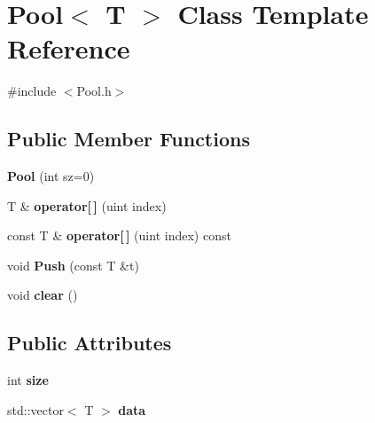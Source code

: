 \hypertarget{classPool}{}\section{Pool$<$ T $>$ Class Template Reference}
\label{classPool}


{\ttfamily \#include $<$Pool.\+h$>$}

\subsection*{Public Member Functions}
\begin{DoxyCompactItemize}
\item 
\hypertarget{classPool_a88910c57fb7099ac3219d5d232cb6d3d}{}{\bfseries Pool} (int sz=0)\label{classPool_a88910c57fb7099ac3219d5d232cb6d3d}

\item 
\hypertarget{classPool_ac4076ad218acab283dacc29e8e2cf855}{}T \& {\bfseries operator\mbox{[}$\,$\mbox{]}} (uint index)\label{classPool_ac4076ad218acab283dacc29e8e2cf855}

\item 
\hypertarget{classPool_a2835287a3cea43e35387d797544d27da}{}const T \& {\bfseries operator\mbox{[}$\,$\mbox{]}} (uint index) const \label{classPool_a2835287a3cea43e35387d797544d27da}

\item 
\hypertarget{classPool_acbec03f17980c373ecf27ed2db420d7b}{}void {\bfseries Push} (const T \&t)\label{classPool_acbec03f17980c373ecf27ed2db420d7b}

\item 
\hypertarget{classPool_aae8e8528b907d7339af05685ba49aa92}{}void {\bfseries clear} ()\label{classPool_aae8e8528b907d7339af05685ba49aa92}

\end{DoxyCompactItemize}
\subsection*{Public Attributes}
\begin{DoxyCompactItemize}
\item 
\hypertarget{classPool_a2c33796e829a9c6d536a85b7ad62d309}{}int {\bfseries size}\label{classPool_a2c33796e829a9c6d536a85b7ad62d309}

\item 
\hypertarget{classPool_a9a3a4597a8e96a97b2186f972104f196}{}std\+::vector$<$ T $>$ {\bfseries data}\label{classPool_a9a3a4597a8e96a97b2186f972104f196}

\end{DoxyCompactItemize}


